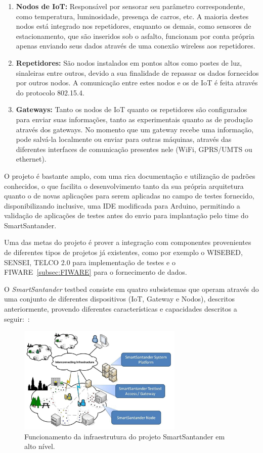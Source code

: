 \begin{enumerate}
\item \textbf{Nodos de IoT:}
	Responsável por sensorar seu parâmetro correspondente, como temperatura, luminosidade, presença de carros, etc. A maioria destes
	nodos está integrado nos repetidores, enquanto os demais, como sensores de estacionamento, que são inseridos sob o asfalto,
	funcionam por conta própria apenas enviando seus dados através de uma conexão wireless aos repetidores.
\item \textbf{Repetidores:}
	São nodos instalados em pontos altos como postes de luz, sinaleiras entre outros, devido a sua finalidade
	de repassar os dados fornecidos por outros nodos. A comunicação entre estes nodos e os de IoT é feita através
	do protocolo 802.15.4.
\item \textbf{Gateways:}
	Tanto os nodos de IoT quanto os repetidores são configurados para enviar suas informações, tanto as experimentais quanto
	as de produção através dos gateways. No momento que um gateway recebe uma informação, pode salvá-la localmente ou enviar
	para outras máquinas, através das diferentes interfaces de comunicação presentes nele (WiFi, GPRS/UMTS ou ethernet).
\end{enumerate}

O projeto é bastante amplo, com uma rica documentação e utilização de padrões conhecidos, o que facilita o desenvolvimento
tanto da sua própria arquitetura quanto o de novas aplicações para serem aplicadas no campo de testes fornecido, disponibilizando
inclusive, uma IDE modificada para Arduino, permitindo a validação de aplicações de testes antes do envio para implantação
pelo time do SmartSantander.

Uma das metas do projeto é prover a integração com componentes provenientes de diferentes tipos de projetos já existentes,
como por exemplo o WISEBED, SENSEI, TELCO 2.0 para implementação de testes e o FIWARE~\ref{subsec:FIWARE} para
o fornecimento de dados.

O \textit{SmartSantander} testbed consiste em quatro subsistemas que operam através do uma conjunto de diferentes
dispositivos (IoT, Gateway e Nodos), descritos anteriormente, provendo diferentes características e
capacidades descritos a seguir:~\cite{citeulike:13508566}:

\begin{figure}[H]
	\centering
		\includegraphics[width=0.7\textwidth]{fig/smartsantander.jpg}
	\caption{Funcionamento da infraestrutura do projeto SmartSantander em alto nível.}
\end{figure}

